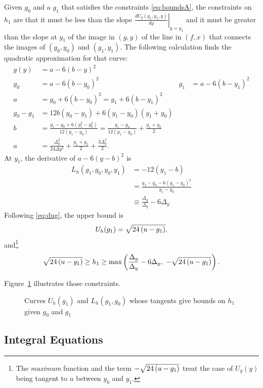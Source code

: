 \documentclass[]{article}
\begin{document}
Given $g_0$ and a $g_1$ that satisfies the constraints
\eqref{eq:boundsA}, the constraints on $h_1$ are that it must be less
than the slope $\left. \frac{d U_g(g_1,y_1,y)}{dy} \right|_{y=y_1}$
and it must be greater than the slope at $y_1$ of the image in $(g,y)$
of the line in $(f,x)$ that connects the images of $(g_0,y_0)$ and
$(g_1,y_1)$.  The following calculation finds the quadratic
approximation for that curve:
\begin{align*}
  g(y) &= a -6(b-y)^2 \\
  g_0 &= a -6(b-y_0)^2 & g_1 &= a -6(b-y_1)^2 \\
  a &= g_0 + 6(b-y_0)^2 =  g_1 + 6(b-y_1)^2 \\
  g_0 -g_1 &= 12b(y_0-y_1) + 6(y_1-y_0)(y_1+y_0) \\
  b &= \frac{g_1-g_0 + 6 (y_1^2-y_0^2)}{12(y_1-y_0)} = \frac{g_1 -
    g_0}{12 (y_1 - y_0)} + \frac{y_1 + y_0}{2}\\
  a &= \frac{\Delta_g^2}{24 \Delta y ^2} + \frac{g_1 + g_2}{2} +
  \frac{ 3 \Delta_y^2}{2}.
\end{align*}
At $y_1$, the derivative of $a-6(y-b)^2$ is
\newcommand{\LhQ}{\frac{\Delta_g}{\Delta_y} - 6 \Delta_y}
\begin{align*}
  L_h(g_1, g_0, y_0, y_1) &= -12(y_1-b) \\
  &= \frac{g_1 - g_0 -6(y_1 - y_0)^2} {y_1-y_0} \\
  & \equiv \LhQ
\end{align*}
Following \eqref{eq:dug}, the upper bound is
\newcommand{\Uh}{\Rad{-g_1}}
\begin{equation*}
  U_h(g_1) = \Uh,
\end{equation*}
and\footnote{The \emph{maximum} function and the term $-\Uh$ treat the
case of $U_g(y)$ being tangent to $u$ between $y_0$ and $y_1$.}
\begin{equation}
  \label{eq:UL_h}
  \Uh \geq h_1 \geq \text{max}\left( \LhQ,~ -\Uh \right).
\end{equation}

Figure~\ref{fig:boundsC} illustrates those constraints.

\begin{figure}
  \centering
    \caption{Curves $U_h(g_1)$ and $L_h(g_1, g_0)$ whose tangents give
      bounds on $h_1$ given $g_0$ and $g_1$}
  \label{fig:boundsC}
\end{figure}

\subsection{Integral Equations}
\label{sec:integral-equations}
\end{document}
